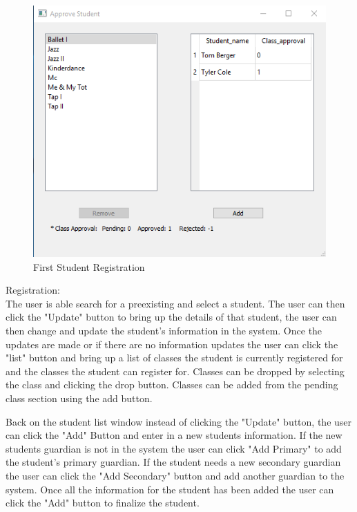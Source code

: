 \begin{figure}
  \includegraphics[width=\linewidth]{pics/userGuide/Addstu.png}
  \caption{First Student Registration}
  \label{fig:User doc: First Student Registration}
\end{figure}

Registration:\\
The user is able search for a preexisting and select a student. The user can then click the "Update" button to bring up the details of that student, the user can then change and update the student's information in the system.  Once the updates are made or if there are no information updates the user can click the "list" button and bring up a list of classes the student is currently registered for and the classes the student can register for. Classes can be dropped by selecting the class and clicking the drop button. Classes can be added from the pending class section using the add button.

Back on the student list window instead of clicking the "Update" button, the user can click the "Add" Button and enter in a new students information. If the  new students guardian is not in the system the user can click "Add Primary" to add the student's primary guardian. If the student needs a new secondary guardian the user can click the "Add Secondary" button and add another guardian to the system.  Once all the information for the student has been added the user can click the "Add" button to finalize the student.

